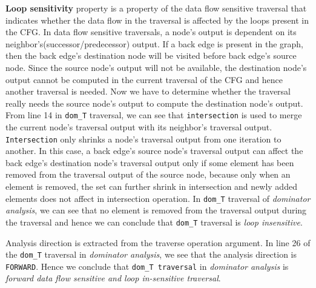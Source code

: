 \begin{definition}
\textbf{Loop sensitivity} property is a property of the data flow sensitive traversal that indicates whether the data flow in the traversal is affected by the loops present in the CFG. In data flow sensitive traversals, a node's output is dependent
on its neighbor's(successor/predecessor) output. If a back edge is present in the graph, then the back edge's destination
node will be visited before back edge's source node. Since the source node's output will not be available, the destination
node's output cannot be computed in the current traversal of the CFG
and hence another traversal is needed. Now we have to determine whether the traversal really needs the source node's
output to compute the destination node's output. From line 14 in \texttt{dom\_T} traversal, we can see that
\texttt{intersection} is used to merge the current node's traversal output with
its neighbor's traversal output. \texttt{Intersection} only shrinks a node's traversal output from one iteration to another. In this case, a back edge's
source node's traversal output can affect the back edge's destination
node's traversal output only if some element has been removed from the traversal output of
the source node, because only when an element is removed,
the set can further shrink in intersection and newly added elements does not affect in intersection operation. In \texttt{dom\_T} traversal of \textit{dominator analysis}, we can see that no element is removed from
the traversal output during the traversal and hence we can conclude that \texttt{dom\_T} traversal is \textit{loop insensitive}.
\end{definition}
Analysis direction is extracted from the traverse operation argument. In line 26 of the \texttt{dom\_T} traversal in \textit{dominator analysis}, we see that the analysis direction is \texttt{FORWARD}.
Hence we conclude that \texttt{dom\_T traversal} in \textit{dominator analysis} is \textit{%
	forward data flow sensitive and loop in-sensitive traversal}.

